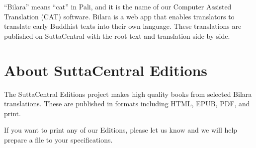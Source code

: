 \documentclass[12pt,openany]{book}%
\begin{document}
“Bilara” means “cat” in Pali, and it is the name of our Computer Assisted Translation (CAT) software. Bilara is a web app that enables translators to translate early Buddhist texts into their own language. These translations are published on SuttaCentral with the root text and translation side by side.

\section*{About SuttaCentral Editions}

The SuttaCentral Editions project makes high quality books from selected Bilara translations. These are published in formats including HTML, EPUB, PDF, and print.

If you want to print any of our Editions, please let us know and we will help prepare a file to your specifications.

%
\end{document}
